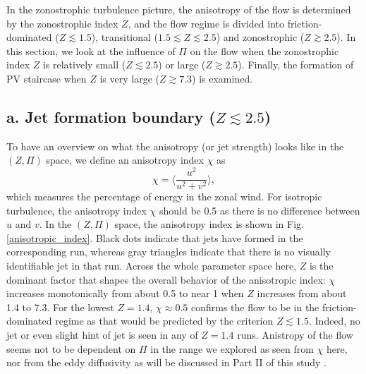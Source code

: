 \documentclass{ametsoc}
\begin{document}
In the zonostrophic turbulence picture, the anisotropy of the flow is
determined by the zonostrophic index $Z$, and the flow regime is
divided into friction-dominated ($Z\apprle1.5$), transitional ($1.5\apprle Z\apprle2.5$)
and zonostrophic ($Z\apprge2.5$). In this section, we look at the
influence of $\Pi$ on the flow when the zonostrophic index $Z$ is
relatively small ($Z\apprle2.5$) or large ($Z\apprge2.5$). Finally,
the formation of PV staircase when $Z$ is very large ($Z\apprge7.3$)
is examined.

\subsection*{a. Jet formation boundary ($Z\apprle2.5$)}

To have an overview on what the anisotropy (or jet strength) looks
like in the $(Z,\Pi)$ space, we define an anisotropy index $\chi$ as
\begin{equation}
\chi=\langle\frac{u^{2}}{u^{2}+v^{2}}\rangle,
\end{equation}
which measures the percentage of energy in the zonal wind. For
isotropic turbulence, the anisotropy index $\chi$ should be 0.5
as there is no difference between $u$ and $v$. In the $(Z,\Pi)$
space, the anisotropy index is shown in Fig. \ref{anisotropic_index}.
Black dots indicate that jets have formed in the corresponding run,
whereas gray triangles indicate that there is no visually identifiable
jet in that run. Across the whole parameter space here, $Z$ is the
dominant factor that shapes the overall behavior of the anisotropic
index: $\chi$ increases monotonically from about 0.5 to near 1 when
$Z$ increases from about 1.4 to 7.3. For the lowest $Z=1.4$, $\chi\approx0.5$
confirms the flow to be in the friction-dominated regime as that would
be predicted by the criterion $Z\apprle1.5$. Indeed, no jet or even
slight hint of jet is seen in any of $Z=1.4$ runs. Anistropy of the flow 
seems not to be dependent on $\Pi$ in the range we 
explored as seen from $\chi$ here, nor from the eddy 
diffusivity as will be discussed in Part II of this study \citep{Chai2019b}.
\end{document}
